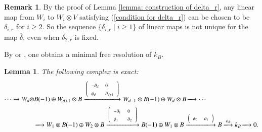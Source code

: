 \documentclass[a4paper,10pt]{amsart}
\newtheorem{lemma}[theorem]{Lemma}
\newtheorem{proposition}[theorem]{Proposition}
\theoremstyle{definition}
\newtheorem{remark}[theorem]{Remark}
\numberwithin{equation}{section}
\DeclareMathOperator{\id}{id}
\begin{document}
\begin{remark}\label{remark: choice of delta_r}
By the proof of Lemma \ref{lemma: construction of delta_r}, any
linear map from $W_i$ to $W_i\otimes V$ satisfying (\ref{condition for delta_r}) can be chosen to be $\delta_{i,r}$ for $i\geq 2$. So the sequence $\{\delta_{i,r}\mid i\geq1\}$ of linear maps is not unique for the map $\overline{\delta}$, even when $\delta_{2,r}$ is fixed.
\end{remark}

By \cite[Theorem 1]{GS} or \cite[Lemma 2.4]{Phan}, one obtains a minimal free resolution of $k_B$.

\begin{lemma}\label{lemma: minimial resolution of k_B}
The following complex is exact:
\begin{equation}\label{resolution of k_B}
\begin{aligned}
\cdots\rightarrow
W_{d}\otimes& B(-1)\oplus W_{d+1}\otimes B
\xlongrightarrow{\left({\scriptscriptstyle\begin{array}{ll}{\scriptstyle -\partial_{d} }& {\scriptstyle0} \\ {\scriptstyle\phi_{d} }&{\scriptstyle \partial_{d+1}}\end{array}}\right)}
W_{d-1}\otimes B(-1)\oplus W_d\otimes B\xlongrightarrow{}\cdots\\
&\xlongrightarrow{}
W_1\otimes B(-1)\oplus W_{2}\otimes B \xlongrightarrow{\left({\scriptscriptstyle\begin{array}{ll}{\scriptstyle -\partial_{1} }& {\scriptstyle0} \\ {\scriptstyle\phi_1 }&{\scriptstyle \partial_{2}}\end{array}}\right)}
B(-1)\oplus W_1\otimes B\xlongrightarrow{\left(\begin{array}{ll}{\scriptstyle \phi_0}& {\scriptstyle \partial_1}\end{array}\right)}
B\xlongrightarrow{\varepsilon_B}
k_B\xlongrightarrow{} 0.
\end{aligned}
\end{equation}
\end{lemma}





\end{document}
